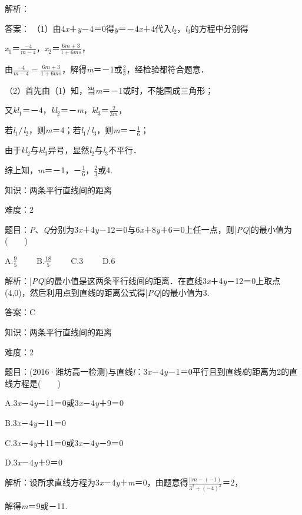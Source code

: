 \documentclass{article} %
\begin{document}
解析：

答案：
（1）由4\textit{x}＋\textit{y}－4＝0得\textit{y}＝－4\textit{x}＋4代入\textit{l}${}_{2}$，\textit{l}${}_{3}$的方程中分别得

\textit{x}${}_{1}$＝$\frac{-4}{m-4}$，\textit{x}${}_{2}$＝$\frac{6m+3}{1+6ms}$，

由$\frac{-4}{m-4}=\frac{6m+3}{1+6ms}$，解得\textit{m}＝－1或$\frac{2}{3}$，经检验都符合题意．

（2）首先由（1）知，当\textit{m}＝－1或时，不能围成三角形；

又\textit{kl}${}_{1}$＝－4，\textit{kl}${}_{2}$＝－\textit{m}，\textit{kl}${}_{3}$＝$\frac{2}{3m}$，

若\textit{l}${}_{1}$$\mathrm{\//}$\textit{l}${}_{2}$，则\textit{m}＝4；若\textit{l}${}_{1}$$\mathrm{\//}$\textit{l}${}_{3}$，则\textit{m}＝－$\frac{1}{6}$；

由于\textit{kl}${}_{2}$与\textit{kl}${}_{3}$异号，显然\textit{l}${}_{2}$与\textit{l}${}_{3}$不平行．

综上知，\textit{m}＝－1，－$\frac{1}{6}$，$\frac{2}{3}$或4.

知识：两条平行直线间的距离

难度：2

题目：\textit{P}、\textit{Q}分别为3\textit{x}＋4\textit{y}－12＝0与6\textit{x}＋8\textit{y}＋6＝0上任一点，则|\textit{PQ}|的最小值为(　　)

A.$\frac{9}{5}$　　 B.$\frac{18}{5}$　　 C.3　　 D.6

解析：|\textit{PQ}|的最小值是这两条平行线间的距离．在直线3\textit{x}＋4\textit{y}－12＝0上取点(4,0)，然后利用点到直线的距离公式得|\textit{PQ}|的最小值为3.

答案：C

知识：两条平行直线间的距离

难度：2

题目：(2016·潍坊高一检测)与直线\textit{l}：3\textit{x}－4\textit{y}－1＝0平行且到直线\textit{l}的距离为2的直线方程是(　　)

A.3\textit{x}－4\textit{y}－11＝0或3\textit{x}－4\textit{y}＋9＝0

B.3\textit{x}－4\textit{y}－11＝0

C.3\textit{x}－4\textit{y}＋11＝0或3\textit{x}－4\textit{y}－9＝0

D.3\textit{x}－4\textit{y}＋9＝0

解析：设所求直线方程为3\textit{x}－4\textit{y}＋\textit{m}＝0，由题意得$\frac{||m-(-1)}{3^2+(-4)^2}$＝2，

解得\textit{m}＝9或－11.
\end{document}
